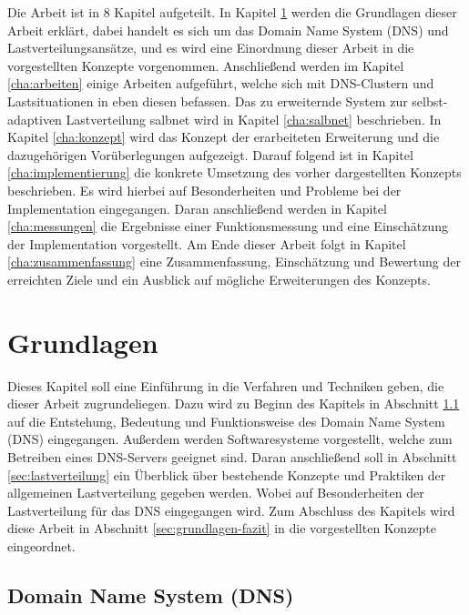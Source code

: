 \documentclass[a4paper, 12pt, BCOR10mm, DIV12, toc=bibliography, toc=listof, german]{scrbook}
\def \dns {Domain Name System (DNS)}
\begin{document}
		Die Arbeit ist in 8 Kapitel aufgeteilt. In Kapitel \ref{cha:grundlagen} werden die Grundlagen
		dieser Arbeit erklärt, dabei handelt es sich um das \dns{} und Lastverteilungsansätze, und es
		wird eine Einordnung dieser Arbeit in die vorgestellten Konzepte vorgenommen. Anschließend
		werden im Kapitel \ref{cha:arbeiten} einige Arbeiten aufgeführt, welche sich mit DNS-Clustern
		und Lastsituationen in eben diesen befassen. Das zu erweiternde System zur selbst-adaptiven
		Lastverteilung salbnet \cite{zinke2012,salbnet} wird in Kapitel \ref{cha:salbnet} beschrieben.
		In Kapitel \ref{cha:konzept} wird das Konzept der erarbeiteten Erweiterung und die dazugehörigen
		Vorüberlegungen aufgezeigt.  Darauf folgend ist in Kapitel \ref{cha:implementierung} die
		konkrete Umsetzung des vorher dargestellten Konzepts beschrieben.  Es wird hierbei auf
		Besonderheiten und Probleme bei der Implementation eingegangen.  Daran anschließend werden in
		Kapitel \ref{cha:messungen} die Ergebnisse einer Funktionsmessung und eine Einschätzung der
		Implementation vorgestellt. Am Ende dieser Arbeit folgt in Kapitel \ref{cha:zusammenfassung}
		eine Zusammenfassung, Einschätzung und Bewertung der erreichten Ziele und ein Ausblick auf
		mögliche Erweiterungen des Konzepts.


	\chapter{Grundlagen} %
	\label{cha:grundlagen}

		Dieses Kapitel soll eine Einführung in die Verfahren und Techniken geben, die dieser Arbeit
		zugrundeliegen.  Dazu wird zu Beginn des Kapitels in Abschnitt \ref{sec:dns} auf die Entstehung,
		Bedeutung und Funktionsweise des \dns{} eingegangen. Außerdem werden Softwaresysteme
		vorgestellt, welche zum Betreiben eines DNS-Servers geeignet sind. Daran anschließend soll in
		Abschnitt \ref{sec:lastverteilung} ein Überblick über bestehende Konzepte und Praktiken der
		allgemeinen Lastverteilung gegeben werden. Wobei auf Besonderheiten der Lastverteilung für das
		DNS eingegangen wird. Zum Abschluss des Kapitels wird diese Arbeit in Abschnitt
		\ref{sec:grundlagen-fazit} in die vorgestellten Konzepte eingeordnet.

		\section{\dns{}} %
		\label{sec:dns}
\end{document}
